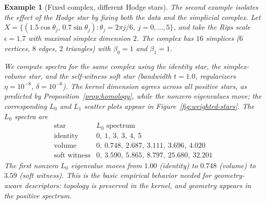 \documentclass[11pt]{amsart}
\theoremstyle{plain}
\newtheorem{example}[theorem]{Example}
\begin{document}
\begin{example}[Fixed complex, different Hodge stars]
The second example isolates the effect of the Hodge star by fixing both the data and the simplicial
complex. Let
$X=\{(1.5\cos\theta_j,\,0.7\sin\theta_j):\theta_j=2\pi j/6,\ j=0,\dots,5\}$, and take the Rips scale
$\epsilon=1.7$ with maximal simplex dimension $2$. The complex has $16$ simplices ($6$ vertices,
$8$ edges, $2$ triangles) with $\beta_0=1$ and $\beta_1=1$.
\begin{center}
\end{center}
We compute spectra for the same complex
using the identity star, the simplex-volume star, and the self-witness soft star (bandwidth
$t=1.0$, regularizers $\eta=10^{-8}$, $\delta=10^{-6}$). The kernel dimension agrees across all
positive stars, as predicted by Proposition~\ref{prop:homology}, while the nonzero eigenvalues move;
the corresponding $L_0$ and $L_1$ scatter plots appear in Figure~\ref{fig:weighted-stars}. The
$L_0$ spectra are
\[
\begin{array}{c|c}
\text{star} & L_0\text{ spectrum}\\
\hline
\text{identity} & 0,\ 1,\ 3,\ 3,\ 4,\ 5\\
\text{volume} & 0,\ 0.748,\ 2.687,\ 3.111,\ 3.696,\ 4.020\\
\text{soft witness} & 0,\ 3.590,\ 5.865,\ 8.797,\ 25.680,\ 32.201
\end{array}
\]
The first
nonzero $L_0$ eigenvalue moves from $1.00$
(identity) to $0.748$ (volume) to $3.59$ (soft witness). This is the basic empirical behavior needed
for geometry-aware descriptors: topology is preserved in the kernel, and geometry appears in the
positive spectrum.
\end{example}
\end{document}
